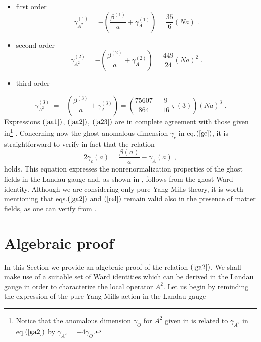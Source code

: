 \documentclass[a4paper,12pt]{article}
\begin{document}
\begin{itemize}
\item  first order 
\begin{equation}
\gamma _{A^{2}}^{(1)}=-\left( \frac{\beta ^{(1)}}{a}+\gamma
_{A}^{(1)}\right) =\frac{35}{6}\left( Na\right) \;.  \label{aa1}
\end{equation}

\item  second order 
\begin{equation}
\gamma _{A^{2}}^{(2)}=-\left( \frac{\beta ^{(2)}}{a}+\gamma
_{A}^{(2)}\right) =\frac{449}{24}\left( Na\right) ^{2}\;.  \label{aa2}
\end{equation}

\item  third order
\end{itemize}

\begin{equation}
\gamma _{A^{2}}^{(3)}\;=-\left( \frac{\beta ^{(3)}}{a}+\gamma
_{A}^{(3)}\right) =\left( \frac{75607}{864}-\frac{9}{16}\varsigma (3)\right)
\left( Na\right) ^{3}\;.  \label{a23}
\end{equation}
Expressions $\left( \ref{aa1}\right) $, $\left( \ref{aa2}\right) $, $\left( 
\ref{a23}\right) $ are in complete agreement with those given in\footnote{%
Notice that the anomalous dimension $\gamma _{O}$ for $A^{2}$ given in \cite
{gr} is related to $\gamma _{A^{2}}$ in eq.$\left( \ref{ga2}\right) $ by $%
\gamma _{A^{2}}=-4\gamma _{O}$.} \cite{gr}. Concerning now the ghost
anomalous dimension $\gamma _{c}$ in eq.$\left( \ref{gc}\right) $, it is
straightforward to verify in fact that the relation 
\begin{equation}
2\gamma _{c}(a)=\frac{\beta (a)}{a}-\gamma _{A}(a)\;,  \label{rel}
\end{equation}
holds. This equation expresses the nonrenormalization properties of the
ghost fields in the Landau gauge and, as shown in \cite{bps}, follows from
the ghost Ward identity. Although we are considering only pure Yang-Mills
theory, it is worth mentioning that eqs.$\left( \ref{ga2}\right) $ and $%
\left( \ref{rel}\right) $ remain valid also in the presence of matter
fields, as one can verify from \cite{gr}.

\section{Algebraic proof}

In this Section we provide an algebraic proof of the relation $\left( \ref
{ga2}\right) $. We shall make use of a suitable set of Ward identities which
can be derived in the Landau gauge in order to characterize the local
operator $A^{2}$. Let us begin by reminding the expression of the pure
Yang-Mills action in the Landau gauge
\end{document}
